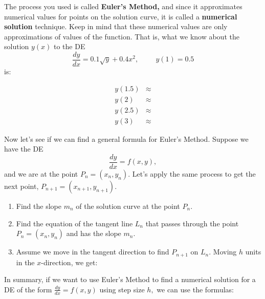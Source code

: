 \documentclass[12pt]{amsart}
\numberwithin{equation}{section}
\begin{document}
	\noindent The process you used is called {\bf Euler's Method,} and since it approximates numerical
	values for points on the solution curve, it is called a {\bf numerical solution} technique.  Keep in mind
	that these numerical values are only approximations of values of the function. That is, what we know about the solution $y(x)$ to the DE
	\[\frac{dy}{dx} = 0.1\sqrt{y} + 0.4x^2, \hspace{1cm} y(1) = 0.5\]
	is:  
	\begin{center}
		\begin{align*}
			y(1.5)	&\approx\\
			y(2)		&\approx\\
			y(2.5)	&\approx\\
			y(3)		&\approx
		\end{align*}
	\end{center}

	\noindent Now let's see if we can find a general formula for Euler's Method. Suppose we have the DE
	\[\dfrac{dy}{dx} = f(x,y),\] and we are at the point $P_n = (x_n, y_n).$ Let's apply the same process to get the next point, $P_{n+1} = (x_{n+1}, y_{n+1}).$

		\begin{enumerate}
			\item Find the slope $m_n$ of the solution curve at the point $P_n.$\\ \vspace{0.5in}
			
			\item Find the equation of the tangent line $L_n$ that passes through
					the point $P_n = (x_n, y_n)$ and has the slope $m_n.$\\ \vspace{0.5in}
					
			\item Assume we move in the tangent direction to find $P_{n+1}$ on $L_n$. Moving $h$ units in the $x$-direction, we get:
			\vfill
		\end{enumerate}

		In summary, if we want to use Euler's Method to find a numerical solution for a DE
		of the form $\frac{dy}{dx} = f(x,y)$ using step size $h,$ we can use the formulas:
		\vfill
\end{document}
